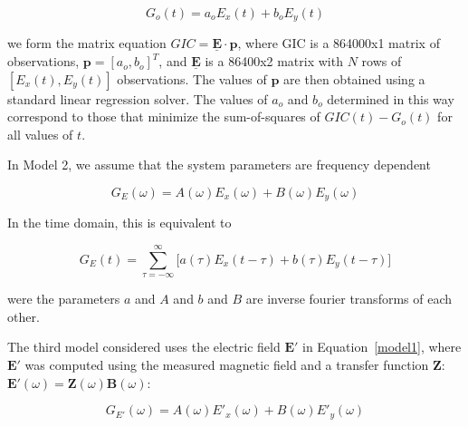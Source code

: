 \documentclass[draft,linenumbers]{agujournal2018}
\begin{document}
\begin{linenomath*}
\begin{equation}
G_o(t) = a_oE_x(t) + b_oE_y(t)
\label{model1}
\end{equation}
\end{linenomath*}

\noindent
we form the matrix equation $GIC = \underline{\mathbf{E}}\cdot\mathbf{p}$, where GIC is a 864000x1 matrix of observations, $\mathbf{p} = [a_o,b_o]^T$, and $\underline{\mathbf{E}}$ is a 86400x2 matrix with $N$ rows of $[E_x(t), E_y(t)]$ observations. The values of $\mathbf{p}$ are then obtained using a standard linear regression solver. The values of $a_o$ and $b_o$ determined in this way correspond to those that minimize the sum-of-squares of $GIC(t)-G_o(t)$ for all values of $t$. \citep[][ provided the mathematically equivalent closed-form equations.]{Pulkkinen2007}

In Model 2, we assume that the system parameters are frequency dependent

\begin{linenomath*}
\begin{equation}
G_E(\omega) = A(\omega)E_x(\omega) + B(\omega)E_y(\omega)
\label{model2}
\tag{2a}
\end{equation}
\end{linenomath*}

\noindent
In the time domain, this is equivalent to

\begin{linenomath*}
\begin{equation}
G_E(t) = \sum_{\tau=-\infty}^{\infty}\big[a(\tau)E_x(t-\tau) + b(\tau)E_y(t-\tau)\big]
\label{model2b}
\tag{2b}
\end{equation}
\end{linenomath*}

\noindent
were the parameters $a$ and $A$ and $b$ and $B$ are inverse fourier transforms of each other.

The third model considered uses the electric field $\mathbf{E}'$ in Equation~\ref{model1}, where $\mathbf{E}'$ was computed using the measured magnetic field and a transfer function $\mathbf{Z}$: $\mathbf{E}'(\omega) = \mathbf{Z}(\omega)\mathbf{B}(\omega)$:

\setcounter{equation}{2}
\begin{linenomath*}
\begin{equation}
G_{E'}(\omega) = A(\omega)E'_x(\omega) + B(\omega)E'_y(\omega)
\end{equation}
\end{linenomath*}
\end{document}
